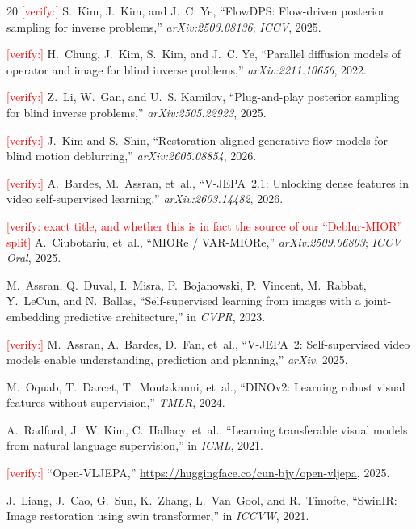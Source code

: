 \documentclass{article}
\newcommand{\authnote}[1]{\textcolor{red}{\footnotesize [#1]}}
\begin{document}
\begin{thebibliography}{20}
\authnote{verify:} S.~Kim, J.~Kim, and J.~C. Ye,
``FlowDPS: Flow-driven posterior sampling for inverse problems,'' \emph{arXiv:2503.08136}; \emph{ICCV}, 2025.

\authnote{verify:} H.~Chung, J.~Kim, S.~Kim, and J.~C. Ye,
``Parallel diffusion models of operator and image for blind inverse problems,'' \emph{arXiv:2211.10656}, 2022.

\authnote{verify:} Z.~Li, W.~Gan, and U.~S. Kamilov,
``Plug-and-play posterior sampling for blind inverse problems,'' \emph{arXiv:2505.22923}, 2025.

\authnote{verify:} J.~Kim and S.~Shin,
``Restoration-aligned generative flow models for blind motion deblurring,'' \emph{arXiv:2605.08854}, 2026.

\authnote{verify:} A.~Bardes, M.~Assran, et~al.,
``V-JEPA~2.1: Unlocking dense features in video self-supervised learning,'' \emph{arXiv:2603.14482}, 2026.

\authnote{verify: exact title, and whether this is in fact the source of our ``Deblur-MIOR'' split} A.~Ciubotariu, et~al.,
``MIORe / VAR-MIORe,'' \emph{arXiv:2509.06803}; \emph{ICCV Oral}, 2025.

M.~Assran, Q.~Duval, I.~Misra, P.~Bojanowski, P.~Vincent, M.~Rabbat, Y.~LeCun, and N.~Ballas,
``Self-supervised learning from images with a joint-embedding predictive architecture,'' in \emph{CVPR}, 2023.

\authnote{verify:} M.~Assran, A.~Bardes, D.~Fan, et~al.,
``V-JEPA~2: Self-supervised video models enable understanding, prediction and planning,'' \emph{arXiv}, 2025.

M.~Oquab, T.~Darcet, T.~Moutakanni, et~al.,
``DINOv2: Learning robust visual features without supervision,'' \emph{TMLR}, 2024.

A.~Radford, J.~W. Kim, C.~Hallacy, et~al.,
``Learning transferable visual models from natural language supervision,'' in \emph{ICML}, 2021.

\authnote{verify:} ``Open-VLJEPA,'' \url{https://huggingface.co/cun-bjy/open-vljepa}, 2025.

J.~Liang, J.~Cao, G.~Sun, K.~Zhang, L.~Van~Gool, and R.~Timofte,
``SwinIR: Image restoration using swin transformer,'' in \emph{ICCVW}, 2021.


\end{thebibliography}
\end{document}
